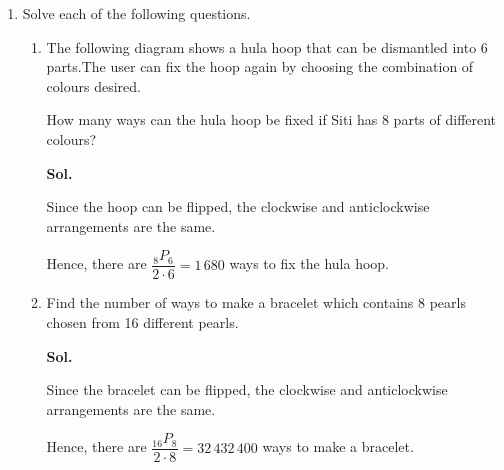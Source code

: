 \documentclass{report}
\newcommand\permtwo[2][^n]{{}_{#1}P_{#2}}
\newcommand{\sol}[1]{

      \noindent \textbf{Sol.}
}
\def\eos{\quad\hbox{\rlap{\hbox{\vrule depth 1.5pt height 2.6mm width 0.2mm \hskip 1mm \vrule height 2.6mm width 0.2mm}}{\vbox{\hrule height 0.2mm width 1.4mm \vskip 2.8mm \hrule depth 1.5pt height -0.35mm width 1.2mm}}}}
\begin{document}
\begin{multicols*}{2}
\begin{enumerate}
\begin{enumerate}
                        \item If each of the children is given only a new school ag, find the number of ways
                              to distribute 9 school bags to 5 children sitting in a circle. \sol{}

                              There are $\dfrac{\permtwo[9]{5}}{5} = 3\,024$ ways to distribute 9 school bags
                              to 5 children sitting in a circle. $\eos$

                        \item Determine the number of ways 5 people can sit in 7 empty chairs at a round
                              table. \sol{}

                              There are $\dfrac{\permtwo[7]{5}}{7} = 360$ ways to arrange 5 people to sit
                  \end{enumerate}

            \item Solve each of the following questions.
                  \begin{enumerate}
                        \item The following diagram shows a hula hoop that can be dismantled into 6 parts.The
                              user can fix the hoop again by choosing the combination of colours desired.

                              How many ways can the hula hoop be fixed if Siti has 8 parts of different
                              colours? \sol{}

                              Since the hoop can be flipped, the clockwise and anticlockwise arrangements are
                              the same.

                              Hence, there are $\dfrac{\permtwo[8]{6}}{2\cdot 6} = 1\,680$ ways to fix the
                              hula hoop. $\eos$

                        \item Find the number of ways to make a bracelet which contains 8 pearls chosen from
                              16 different pearls. \sol{}

                              Since the bracelet can be flipped, the clockwise and anticlockwise arrangements
                              are the same.

                              Hence, there are $\dfrac{\permtwo[16]{8}}{2\cdot 8} = 32\,432\,400$ ways to
                              make a bracelet. $\eos$
                  \end{enumerate}


\end{enumerate}
\end{multicols*}
\end{document}
